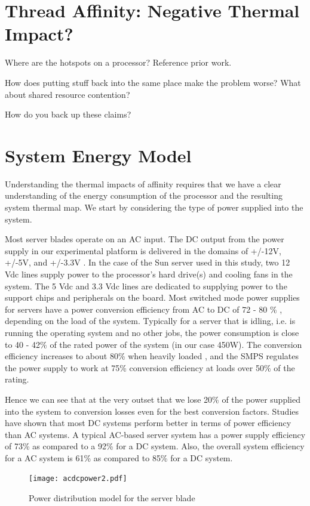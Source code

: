 \documentclass[12pt,onecolumn]{ULieeetran}
\begin{document}
\section{Thread Affinity: Negative Thermal Impact?}
\label{sec:affinimpact}

Where are the hotspots on a processor?  Reference prior work.

How does putting stuff back into the same place make the problem worse?
What about shared resource contention?

How do you back up these claims?


\section{System Energy Model}
\label{sec:modelstruct}

Understanding the thermal impacts of affinity requires that we have a
clear understanding of the energy consumption of the processor and the
resulting system thermal map. We start by considering the type of power
supplied into the system.

Most server blades operate on an AC input.  The DC output from the power
supply in our experimental platform is delivered in the domains of
+/-12V, +/-5V, and +/-3.3V \cite{SSI2004}. In the case of the Sun server
used in this study, two 12 Vdc lines supply power to the processor's
hard drive(s) and cooling fans in the system. The 5 Vdc and 3.3 Vdc lines
are dedicated to supplying power to the support chips and peripherals
on the board.  Most switched mode power supplies for servers have a
power conversion efficiency from AC to DC of 72 - 80 \% , depending on
the load of the system. Typically for a server that is idling, i.e. is
running the operating system and no other jobs, the power consumption is
close to 40 - 42\% of the rated power of the system (in our case
450W). The conversion efficiency increases to about 80\% when heavily
loaded , and the SMPS regulates the power supply to work at 75\%
conversion efficiency at loads over 50\% of the rating.

Hence we can see that at the very outset that we lose 20\% of the
power supplied into the system to conversion losses even for the best
conversion factors. Studies have shown \cite{ton2008} that most DC
systems perform better in terms of power efficiency than AC systems. A
typical AC-based server system has a power supply efficiency of 73\% as
compared to a 92\% for a DC system. Also, the overall system efficiency for a
AC system is 61\% as compared to 85\% for a DC system.
\begin{figure}[htbp]
\begin{center}
     \texttt{[image: acdcpower2.pdf]}
     \caption{Power distribution model for the server blade}
     \label{fig:acdcpwr}
\end{center}
\end{figure}
\end{document}
